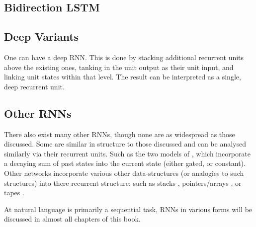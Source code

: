 \documentclass[12pt,parskip]{komatufte}
\begin{document}
\subsection{Bidirection LSTM}

\subsection{Deep Variants}
One can have a deep RNN.
This is done by stacking additional recurrent units above the existing ones,
tanking in the unit output as their unit input, and linking unit states within that level.
The result can be interpreted as a single, deep recurrent unit.

\subsection{Other RNNs}
There also exist many other RNNs, though none are as widespread as those discussed.
Some are similar in structure to those discussed and can be analysed similarly via their recurrent units.
Such as the two models of , which incorporate a decaying sum of past states into the current state (either gated, or constant).
Other networks incorporate various other data-structures (or analogies to such structures) into there recurrent structure:
such as stacks , pointers/arrays , or tapes .

At natural language is primarily a sequential task, RNNs in various forms will be discussed in almost all chapters of this book.
 
\end{document}

